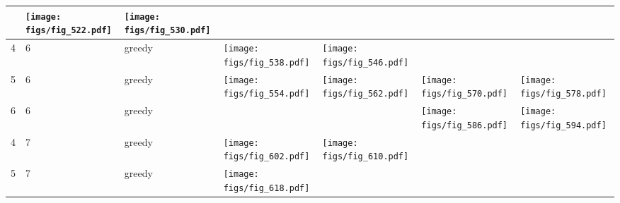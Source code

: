 \documentclass[oneside,canadian,landscape]{article}
\begin{document}
\begin{center}
\begin{longtable}{|l|l|l||l|l|l|l|}
\begin{minipage}{3.5cm}
\end{minipage}
&\begin{minipage}{3.5cm}
\texttt{[image: figs/fig\_522.pdf]}
\end{minipage}
&\begin{minipage}{3.5cm}
\texttt{[image: figs/fig\_530.pdf]}
\end{minipage}
\\ \hline
4&6&greedy&\begin{minipage}{3.5cm}
\texttt{[image: figs/fig\_538.pdf]}
\end{minipage}
&\begin{minipage}{3.5cm}
\texttt{[image: figs/fig\_546.pdf]}
\end{minipage}
&&\\ \hline
5&6&greedy&\begin{minipage}{3.5cm}
\texttt{[image: figs/fig\_554.pdf]}
\end{minipage}
&\begin{minipage}{3.5cm}
\texttt{[image: figs/fig\_562.pdf]}
\end{minipage}
&\begin{minipage}{3.5cm}
\texttt{[image: figs/fig\_570.pdf]}
\end{minipage}
&\begin{minipage}{3.5cm}
\texttt{[image: figs/fig\_578.pdf]}
\end{minipage}
\\ \hline
6&6&greedy&&&\begin{minipage}{3.5cm}
\texttt{[image: figs/fig\_586.pdf]}
\end{minipage}
&\begin{minipage}{3.5cm}
\texttt{[image: figs/fig\_594.pdf]}
\end{minipage}
\\ \hline
4&7&greedy&\begin{minipage}{3.5cm}
\texttt{[image: figs/fig\_602.pdf]}
\end{minipage}
&\begin{minipage}{3.5cm}
\texttt{[image: figs/fig\_610.pdf]}
\end{minipage}
&&\\ \hline
5&7&greedy&\begin{minipage}{3.5cm}
\texttt{[image: figs/fig\_618.pdf]}
\end{minipage}
&\begin{minipage}{3.5cm}

\end{minipage}
\end{longtable}
\end{center}
\end{document}

